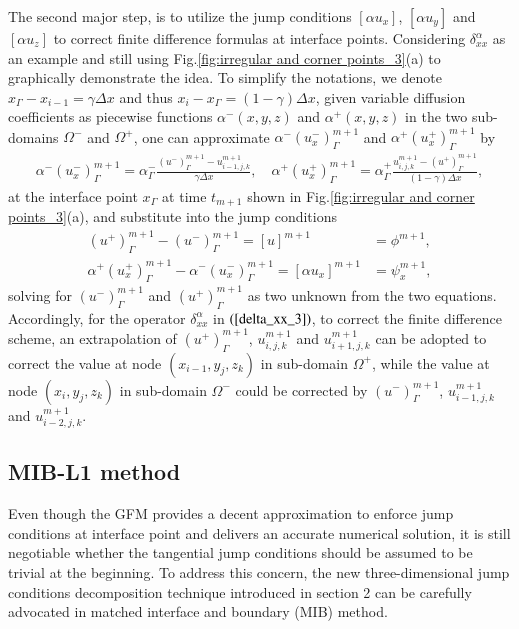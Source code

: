 \documentclass[dissertation]{uathesis}
\begin{document}
\begin{body}
The second major step, is to utilize the jump conditions $[\alpha u_x]$, $[\alpha u_y]$ and $[\alpha u_z]$ to correct finite difference formulas at interface points. Considering $\delta^{\alpha}_{xx}$ as an example and still using Fig.\ref{fig:irregular and corner points_3}(a) to graphically  demonstrate the idea. To simplify the notations, we denote $x_\Gamma - x_{i-1} = \gamma \Delta x$ and thus $x_{i} - x_\Gamma = (1 - \gamma) \Delta x$, given variable diffusion coefficients as piecewise functions $\alpha^{-}(x,y,z)$ and $\alpha^{+}(x,y,z)$ in the two sub-domains $\Omega^{-}$ and $\Omega^{+}$, one can approximate $\alpha^{-}(u^{-}_{x})^{m+1}_{\Gamma}$ and $\alpha^{+}(u^{+}_{x})^{m+1}_{\Gamma}$ by
%
\begin{align}\label{GFM_interface_approximation_3}
\alpha^{-}(u^{-}_{x})^{m+1}_{\Gamma} = \alpha^{-}_{\Gamma}\frac{(u^{-})^{m+1}_{\Gamma} - 
	u^{m+1}_{i-1,j,k}}{\gamma \Delta x}, \quad
\alpha^{+}(u^{+}_{x})^{m+1}_{\Gamma} = \alpha^{+}_{\Gamma}\frac{u^{m+1}_{i,j,k} - 
	(u^{+})^{m+1}_{\Gamma}}{(1-\gamma)\Delta x}, 
\end{align}
%
at the interface point $x_\Gamma$ at time $t_{m+1}$ shown in Fig.\ref{fig:irregular and corner points_3}(a), and substitute into the jump conditions
%
\begin{align}
\label{GFM_jump_equation_1_3}
(u^{+})^{m+1}_{\Gamma} - (u^{-})^{m+1}_{\Gamma} = [u]^{m+1} &= \phi^{m+1}, \\
\label{GFM_jump_equation_2_3}
\alpha^{+} (u^{+}_x)^{m+1}_{\Gamma} - \alpha^{-}(u^{-}_x)^{m+1}_{\Gamma} = 
[\alpha u_x]^{m+1} &= \psi_x^{m+1}, 
\end{align}
%
solving for $(u^{-})^{m+1}_{\Gamma}$ and $(u^{+})^{m+1}_{\Gamma}$ as two unknown from the two equations. Accordingly, for the operator $\delta_{xx}^{\alpha}$ in $(\ref{delta_xx_3})$, to correct the finite difference scheme, an extrapolation of $(u^{+})^{m+1}_{\Gamma}$, $u^{m+1}_{i,j,k}$ and $u^{m+1}_{i+1,j,k}$ can be adopted to correct the value at node $(x_{i-1},y_j,z_k)$ in sub-domain $\Omega^{+}$, while the value at node $(x_i,y_j,z_k)$ in sub-domain $\Omega^{-}$ could be corrected by $(u^{-})^{m+1}_{\Gamma}$, $u^{m+1}_{i-1,j,k}$ and $u^{m+1}_{i-2,j,k}$.

\subsection{MIB-L1 method}
Even though the GFM provides a decent approximation to enforce jump conditions at interface point and delivers an accurate numerical solution, it is still negotiable whether the tangential jump conditions should be assumed to be trivial at the beginning. To address this concern, the new three-dimensional jump conditions decomposition technique introduced in section 2 can be carefully advocated in matched interface and boundary (MIB) method.


\end{body}
\end{document}
